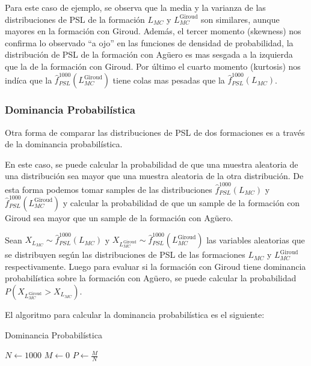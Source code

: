 \documentclass[
  a4paper,
]{article}
\begin{document}
Para este caso de ejemplo, se observa que la media y la varianza de las
distribuciones de PSL de la formación \(L_{MC}\) y
\(L_{MC}^{\text{Giroud}}\) son similares, aunque mayores en la formación
con Giroud. Además, el tercer momento (skewness) nos confirma lo
observado ``a ojo'' en las funciones de densidad de probabilidad, la
distribución de PSL de la formación con Agüero es mas sesgada a la
izquierda que la de la formación con Giroud. Por último el cuarto
momento (kurtosis) nos indíca que la
\(\hat{f}^{1000}_{PSL}(L_{MC}^{\text{Giroud}})\) tiene colas mas pesadas
que la \(\hat{f}^{1000}_{PSL}(L_{MC})\).

\hypertarget{dominancia-probabiluxedstica}{%
\subsubsection{Dominancia
Probabilística}\label{dominancia-probabiluxedstica}}

Otra forma de comparar las distribuciones de PSL de dos formaciones es a
través de la dominancia probabilística.

En este caso, se puede calcular la probabilidad de que una muestra
aleatoria de una distribución sea mayor que una muestra aleatoria de la
otra distribución. De esta forma podemos tomar samples de las
distribuciones \(\hat{f}^{1000}_{PSL}(L_{MC})\) y
\(\hat{f}^{1000}_{PSL}(L_{MC}^{\text{Giroud}})\) y calcular la
probabilidad de que un sample de la formación con Giroud sea mayor que
un sample de la formación con Agüero.

Sean \(X_{L_{MC}} \sim \hat{f}^{1000}_{PSL}(L_{MC})\) y
\(X_{L_{MC}^{\text{Giroud}}} \sim \hat{f}^{1000}_{PSL}(L_{MC}^{\text{Giroud}})\)
las variables aleatorias que se distribuyen según las distribuciones de
PSL de las formaciones \(L_{MC}\) y \(L_{MC}^{\text{Giroud}}\)
respectivamente. Luego para evaluar si la formación con Giroud tiene
dominancia probabilística sobre la formación con Agüero, se puede
calcular la probabilidad \(P(X_{L_{MC}^{\text{Giroud}}}>X_{L_{MC}})\).

El algoritmo para calcular la dominancia probabilística es el siguiente:

\begin{algorithm}[H]
\caption{Dominancia Probabilística}\label{alg:cap2}
\SetAlgoLined
{}
$N \gets 1000$\;
$M \gets 0$\;
$P \gets \frac{M}{N}$\;
\end{algorithm}
\end{document}
